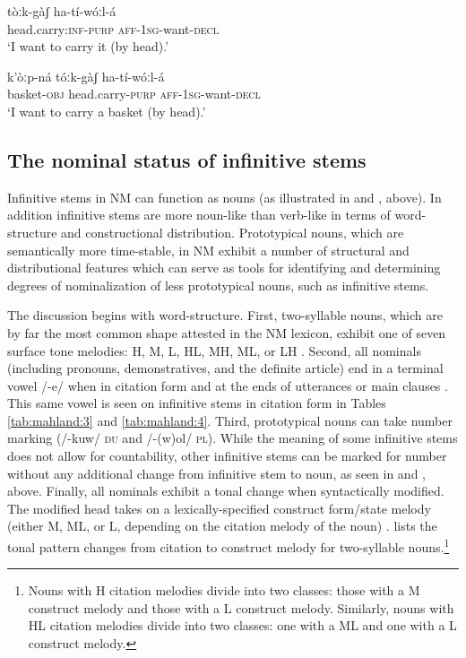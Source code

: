 \documentclass[output=paper]{langsci/langscibook}
\begin{document}
\ea\label{ex:mahland:22}
\gll tòːk-gàʃ                    ha-tí-wóːl-{\downstep}á\\
head.carry:\textsc{inf-purp}   \textsc{aff-1sg}{}-want-\textsc{decl} \\
\glt `I want to carry it (by head).'
\z

\ea\label{ex:mahland:23}
\gll k'òːp-ná      tóːk-gàʃ               ha-tí-wóːl-{\downstep}á\\
basket\textsc{{}-obj}   head.carry\textsc{{}-purp}   \textsc{aff-1sg}{}-want\textsc{{}-decl} \\
\glt `I want to carry a basket (by head).'
\z

\subsection{The nominal status of infinitive stems}\label{sec:mahland:1.4}

Infinitive stems in NM can function as nouns (as illustrated in  and , above). In addition infinitive stems are more noun-like than verb-like in terms of word-structure and constructional distribution. Prototypical nouns, which are semantically more time-stable, in NM exhibit a number of structural and distributional features which can serve as tools for identifying and determining degrees of nominalization of less prototypical nouns, such as infinitive stems. 


The discussion begins with word-structure. First, two-syllable nouns, which are by far the most common shape attested in the NM lexicon, exhibit one of seven surface tone melodies: H, M, L, HL, MH, ML, or LH \citep[23]{Ahland2009}. Second, all nominals (including pronouns, demonstratives, and the definite article) end in a terminal vowel /-e/ when in citation form and at the ends of utterances or main clauses \citep[194, 313]{Ahland2012}. This same vowel is seen on infinitive stems in citation form in Tables \ref{tab:mahland:3} and \ref{tab:mahland:4}. Third, prototypical nouns can take number marking (/-kuw/ \textsc{du} and /-(w)ol/ \textsc{pl}). While the meaning of some infinitive stems does not allow for countability, other infinitive stems can be marked for number without any additional change from infinitive stem to noun, as seen in  and , above. Finally, all nominals exhibit a tonal change when syntactically modified. The modified head takes on a lexically-specified construct form/state melody (either M, ML, or L, depending on the citation melody of the noun) \citep[146]{Ahland2012}.  lists the tonal pattern changes from citation to construct melody for two-syllable nouns.\footnote{Nouns with H citation melodies divide into two classes: those with a M construct melody and those with a L construct melody. Similarly, nouns with HL citation melodies divide into two classes: one with a ML and one with a L construct melody.}
\end{document}
